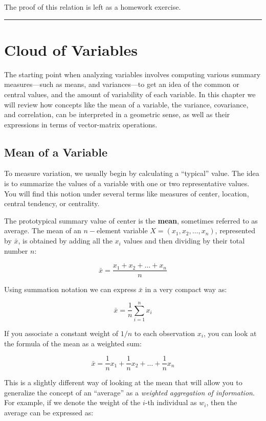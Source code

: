 \documentclass[]{book}
\begin{document}
The proof of this relation is left as a homework exercise.

\begin{center}\rule{0.5\linewidth}{\linethickness}\end{center}

\hypertarget{cloud-of-variables}{%
\section{Cloud of Variables}\label{cloud-of-variables}}

The starting point when analyzing variables involves computing various summary
measures---such as means, and variances---to get an idea of the common or central
values, and the amount of variability of each variable. In this chapter we will
review how concepts like the mean of a variable, the variance, covariance,
and correlation, can be interpreted in a geometric sense, as well as their
expressions in terms of vector-matrix operations.

\hypertarget{mean-of-a-variable}{%
\subsection{Mean of a Variable}\label{mean-of-a-variable}}

To measure variation, we usually begin by calculating a ``typical'' value.
The idea is to summarize the values of a variable with one or two representative
values. You will find this notion under several terms like measures of center,
location, central tendency, or centrality.

The prototypical summary value of center is the \textbf{mean}, sometimes referred to
as average. The mean of an \(n-\)element variable \(X = (x_1, x_2, \dots, x_n)\),
represented by \(\bar{x}\), is obtained by adding all the \(x_i\) values and then
dividing by their total number \(n\):

\[
\bar{x} = \frac{x_1 + x_2 + \dots + x_n}{n}
\]

Using summation notation we can express \(\bar{x}\) in a very compact way as:

\[
\bar{x} = \frac{1}{n} \sum_{i = 1}^{n} x_i
\]

If you associate a constant weight of \(1/n\) to each observation \(x_i\), you can look at the formula of the mean as a weighted sum:

\[
\bar{x} = \frac{1}{n} x_1 + \frac{1}{n} x_2 + \dots + \frac{1}{n} x_n
\]

This is a slightly different way of looking at the mean that will allow you to
generalize the concept of an ``average'' as a \emph{weighted aggregation of information}.
For example, if we denote the weight of the \(i\)-th individual as \(w_i\), then the
average can be expressed as:
\end{document}
